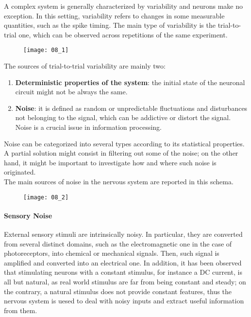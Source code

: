 A complex system is generally characterized by variability and neurons make no
exception. In this setting, variability refers to changes in some measurable quantities,
such as the spike timing. The main type of variability is the trial-to-trial one, which
can be observed across repetitions of the same experiment.
\begin{figure}[H]
    \texttt{[image: 08\_1]}
    \centering
\end{figure}
The sources of trial-to-trial variability are mainly two:
\begin{enumerate}
    \item \textbf{Deterministic properties of the system}: the initial state of the
          neuronal circuit might not be always the same.
    \item \textbf{Noise}: it is defined as random or unpredictable fluctuations
          and disturbances not belonging to the signal, which can be addictive or distort
          the signal. Noise is a crucial issue in information processing.
\end{enumerate}
Noise can be categorized into several types according to its statistical properties.
A partial solution might consist in filtering out some of the noise; on the other hand,
it might be important to investigate how and where such noise is originated.\\
The main sources of noise in the nervous system are reported in this schema.
\begin{figure}[H]
    \texttt{[image: 08\_2]}
    \centering
\end{figure}
\paragraph{Sensory Noise} External sensory stimuli are intrinsically noisy. In particular,
they are converted from several distinct domains, such as the electromagnetic one in the
case of photoreceptors, into chemical or mechanical signals. Then, such signal is amplified
and converted into an electrical one. In addition, it has been observed that stimulating
neurons with a constant stimulus, for instance a DC current, is all but natural, as real world
stimulus are far from being constant and steady; on the contrary, a natural stimulus does not
provide constant features, thus the nervous system is uesed to deal with noisy inputs and
extract useful information from them.
